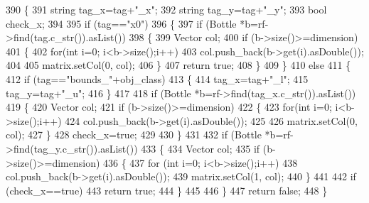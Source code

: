 \begin{DoxyCode}
390 \{
391    \textcolor{keywordtype}{string} tag\_x=tag+\textcolor{stringliteral}{"\_x"};
392    \textcolor{keywordtype}{string} tag\_y=tag+\textcolor{stringliteral}{"\_y"};
393    \textcolor{keywordtype}{bool} check\_x;
394 
395    \textcolor{keywordflow}{if} (tag==\textcolor{stringliteral}{"x0"})
396    \{
397        \textcolor{keywordflow}{if} (Bottle *b=rf->find(tag.c\_str()).asList())
398        \{
399            Vector col;
400            \textcolor{keywordflow}{if} (b->size()>=dimension)
401            \{
402                \textcolor{keywordflow}{for}(\textcolor{keywordtype}{int} i=0; i<b->size();i++)
403                    col.push\_back(b->get(i).asDouble());
404 
405                matrix.setCol(0, col);
406            \}
407            \textcolor{keywordflow}{return} \textcolor{keyword}{true};
408        \}
409    \}
410    \textcolor{keywordflow}{else}
411    \{
412        \textcolor{keywordflow}{if} (tag==\textcolor{stringliteral}{"bounds\_"}+obj\_class)
413        \{
414            tag\_x=tag+\textcolor{stringliteral}{"\_l"};
415            tag\_y=tag+\textcolor{stringliteral}{"\_u"};
416        \}
417 
418        \textcolor{keywordflow}{if} (Bottle *b=rf->find(tag\_x.c\_str()).asList())
419        \{
420            Vector col;
421            \textcolor{keywordflow}{if} (b->size()>=dimension)
422            \{
423                \textcolor{keywordflow}{for}(\textcolor{keywordtype}{int} i=0; i<b->size();i++)
424                    col.push\_back(b->get(i).asDouble());
425 
426                matrix.setCol(0, col);
427            \}
428            check\_x=\textcolor{keyword}{true};
429 
430        \}
431 
432        \textcolor{keywordflow}{if} (Bottle *b=rf->find(tag\_y.c\_str()).asList())
433        \{
434            Vector col;
435            \textcolor{keywordflow}{if} (b->size()>=dimension)
436            \{
437                \textcolor{keywordflow}{for} (\textcolor{keywordtype}{int} i=0; i<b->size();i++)
438                    col.push\_back(b->get(i).asDouble());
439                matrix.setCol(1, col);
440            \}
441 
442            \textcolor{keywordflow}{if} (check\_x==\textcolor{keyword}{true})
443                \textcolor{keywordflow}{return} \textcolor{keyword}{true};
444        \}
445 
446    \}
447    \textcolor{keywordflow}{return} \textcolor{keyword}{false};
448 \}
\end{DoxyCode}
